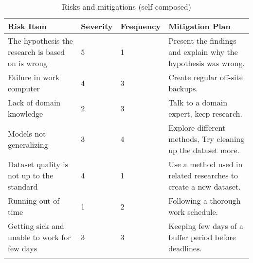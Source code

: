 \begin{longtable}{|p{4.8cm}|p{1.35cm}|p{1.8cm}|p{7cm}|}
    \hline
    \textbf{Risk Item} & 
    \textbf{Severity} & 
    \textbf{Frequency} & 
    \textbf{Mitigation Plan}
    \\ \hline
    
    The hypothesis the research is based on is wrong & 
    5 & 
    1 & 
    Present the findings and explain why the hypothesis was wrong.
    \\ \hline
    
    Failure in work computer & 
    4 & 
    3 & 
    Create regular off-site backups.
    \\ \hline
    
    Lack of domain knowledge & 
    2 & 
    3 & 
    Talk to a domain expert, keep research.
    \\ \hline
    
    Models not generalizing & 
    3 & 
    4 & 
    Explore different methods, Try cleaning up the dataset more.
    \\ \hline
    
    Dataset quality is not up to the standard & 
    4 & 
    1 & 
    Use a method used in related researches to create a new dataset.
    \\ \hline
    
    Running out of time & 
    1 & 
    2 & 
    Following a thorough work schedule.
    \\ \hline
    
    Getting sick and unable to work for few days & 
    3 & 
    3 & 
    Keeping few days of a buffer period before deadlines.
    \\ \hline
    \caption{Risks and mitigations (self-composed)}
\end{longtable}